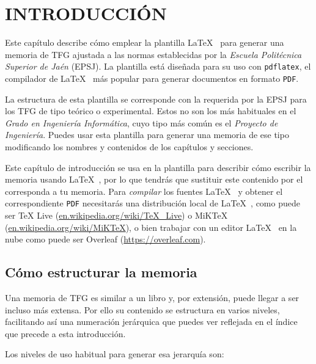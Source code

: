 
\chapter{INTRODUCCIÓN}  

Este capítulo describe cómo emplear la plantilla \LaTeX~ para generar una memoria de TFG ajustada a las normas establecidas por la \textit{Escuela Politécnica Superior de Jaén} (EPSJ). La plantilla está diseñada para su uso con \verb*|pdflatex|, el compilador de \LaTeX~ más popular para generar documentos en formato \verb*|PDF|.

La estructura de esta plantilla se corresponde con la requerida por la EPSJ para los TFG de tipo teórico o experimental. Estos no son los más habituales en el \textit{Grado en Ingeniería Informática}, cuyo tipo más común es el \textit{Proyecto de Ingeniería}. Puedes usar esta plantilla para generar una memoria de ese tipo modificando los nombres y contenidos de los capítulos y secciones.

Este capítulo de introducción se usa en la plantilla para describir cómo escribir la memoria usando \LaTeX~, por lo que tendrás que sustituir este contenido por el corresponda a tu memoria. Para \textit{compilar} los fuentes \LaTeX~ y obtener el correspondiente \verb*|PDF| necesitarás una distribución local de \LaTeX~, como puede ser TeX Live (\url{en.wikipedia.org/wiki/TeX\_Live}) o MiKTeX (\url{en.wikipedia.org/wiki/MiKTeX}), o bien trabajar con un editor \LaTeX~ en la nube como puede ser Overleaf (\url{https://overleaf.com}).

\section{Cómo estructurar la memoria}

Una memoria de TFG es similar a un libro y, por extensión, puede llegar a ser incluso más extensa. Por ello su contenido se estructura en varios niveles, facilitando así una numeración jerárquica que puedes ver reflejada en el índice que precede a esta introducción. 

Los niveles de uso habitual para generar esa jerarquía son:

